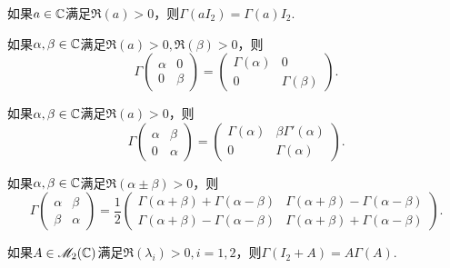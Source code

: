 \begin{corollary}[特殊矩阵的gamma函数]
  \begin{enum}
    \item 如果$a\in\mathbb C$满足$\Re(a)>0$，则$\Gamma(aI_2)=\Gamma(a)I_2$.
    \item 如果$\alpha,\beta\in\mathbb C$满足$\Re(a)>0,\Re(\beta)>0$，则
        \[
          \Gamma\begin{pmatrix}
            \alpha & 0 \\
            0 & \beta
          \end{pmatrix} = \begin{pmatrix}
            \Gamma(\alpha) & 0 \\
            0 & \Gamma(\beta)
          \end{pmatrix}.
        \]
    \item\label{coro4.10c} 如果$\alpha,\beta\in\mathbb C$满足$\Re(a)>0$，则
        \[
          \Gamma\begin{pmatrix}
            \alpha & \beta \\
            0 & \alpha
          \end{pmatrix} = \begin{pmatrix}
            \Gamma(\alpha) & \beta\Gamma'(\alpha) \\
            0 & \Gamma(\alpha)
          \end{pmatrix}.
        \]
    \item 如果$\alpha,\beta\in\mathbb C$满足$\Re(\alpha\pm\beta)>0$，则
        \[
          \Gamma\begin{pmatrix}
            \alpha & \beta \\
            \beta & \alpha
          \end{pmatrix} = \frac12 \begin{pmatrix}
            \Gamma(\alpha+\beta) + \Gamma(\alpha-\beta) & \Gamma(\alpha+\beta) - \Gamma(\alpha-\beta) \\
            \Gamma(\alpha+\beta) - \Gamma(\alpha-\beta) & \Gamma(\alpha+\beta) + \Gamma(\alpha-\beta)
          \end{pmatrix}.
        \]
  \end{enum}
\end{corollary}

\begin{mybox}
  \begin{lemma}[一个矩阵差分公式.]

    如果$A\in\mathscr M_2(\mathbb C)$满足$\Re(\lambda_i)>0,i=1,2$，则$\Gamma(I_2+A)=A\Gamma(A)$.
  \end{lemma}
\end{mybox}

